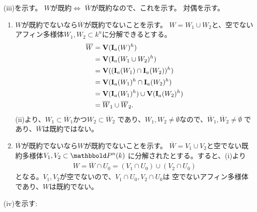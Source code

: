\begin{myproof}
  (iii)を示す。
  $W$が既約$\iff $ $\overline W$が既約なので、これを示す。
  対偶を示す。
  \begin{enumerate}
    \item $W$が既約でないなら$\overline W$が既約でないことを示す。
    $W=W_1 \cup W_2$と、空でないアフィン多様体$W_1,W_2 \subset k^n$に分解できるとする。
    \begin{align}
      \overline W
      &=
      \textbf V(\textbf I_a(W)^h)\\
      &=
      \textbf V(\textbf I_a(W_1 \cup W_2)^h)\\
      &=
      \textbf V((\textbf I_a(W_1) \cap \textbf I_a(W_2))^h)\\
      &=
      \textbf V(\textbf I_a(W_1)^h \cap \textbf I_a(W_2)^h)\\
      &=
      \textbf V(\textbf I_a(W_1)^h) \cup \textbf V(\textbf I_a(W_2)^h)\\
      &=
      \overline W_1 \cup \overline W_2.
    \end{align}
    (ii)より、$W_1 \subset \overline W_1$かつ$W_2 \subset \overline W_2$
    であり、$W_1,W_2 \neq \emptyset$なので、$\overline W_1,\overline W_2 \neq \emptyset$
    であり、$\overline W$は既約ではない。
    \item
     $\overline W$が既約でないなら$W$が既約でないことを示す。
     $\overline W = V_1 \cup V_2$と空でない既約多様体$V_1,V_2 \subset \P^n(k)$
     に分解されたとする。すると、(i)より
     \begin{align}
       W = \overline W \cap U_0 = (V_1 \cap U_0) \cup (V_2 \cap U_0)
     \end{align}
     となる。$V_1,V_2$が空でないので、$V_1 \cap U_0,V_2 \cap U_0$は
     空でないアフィン多様体であり、$W$は既約でない。
  \end{enumerate}

  (iv)を示す:

\end{myproof}
